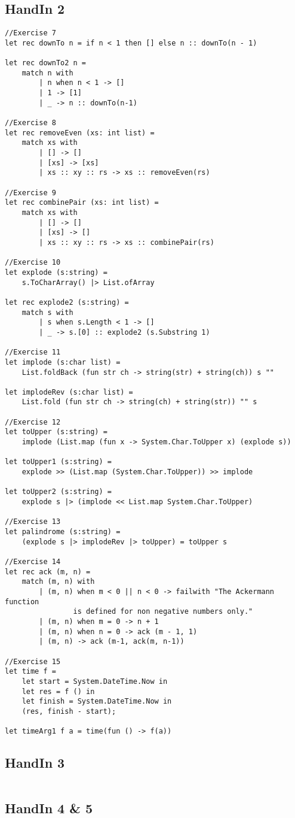 \subsection{HandIn 2}
\label{Appendix_FSharp_Grooss_2}
\begin{lstlisting}
//Exercise 7
let rec downTo n = if n < 1 then [] else n :: downTo(n - 1)

let rec downTo2 n = 
    match n with
		| n when n < 1 -> []
        | 1 -> [1]
        | _ -> n :: downTo(n-1)

//Exercise 8
let rec removeEven (xs: int list) =
    match xs with
        | [] -> []
        | [xs] -> [xs]
        | xs :: xy :: rs -> xs :: removeEven(rs)

//Exercise 9
let rec combinePair (xs: int list) =
    match xs with
        | [] -> []
        | [xs] -> []
        | xs :: xy :: rs -> xs :: combinePair(rs)

//Exercise 10
let explode (s:string) =
    s.ToCharArray() |> List.ofArray

let rec explode2 (s:string) =
    match s with
        | s when s.Length < 1 -> []
        | _ -> s.[0] :: explode2 (s.Substring 1)

//Exercise 11
let implode (s:char list) =
    List.foldBack (fun str ch -> string(str) + string(ch)) s ""
    
let implodeRev (s:char list) =
    List.fold (fun str ch -> string(ch) + string(str)) "" s

//Exercise 12
let toUpper (s:string) =
    implode (List.map (fun x -> System.Char.ToUpper x) (explode s))

let toUpper1 (s:string) =
    explode >> (List.map (System.Char.ToUpper)) >> implode

let toUpper2 (s:string) =
    explode s |> (implode << List.map System.Char.ToUpper)

//Exercise 13
let palindrome (s:string) =
    (explode s |> implodeRev |> toUpper) = toUpper s

//Exercise 14
let rec ack (m, n) =
    match (m, n) with
        | (m, n) when m < 0 || n < 0 -> failwith "The Ackermann function 
				is defined for non negative numbers only."
        | (m, n) when m = 0 -> n + 1
        | (m, n) when n = 0 -> ack (m - 1, 1)
        | (m, n) -> ack (m-1, ack(m, n-1))

//Exercise 15
let time f =
    let start = System.DateTime.Now in
    let res = f () in
    let finish = System.DateTime.Now in
    (res, finish - start);

let timeArg1 f a = time(fun () -> f(a))
\end{lstlisting}
\subsection{HandIn 3}
\label{Appendix_FSharp_Grooss_3}
\begin{lstlisting}
\end{lstlisting}
\subsection{HandIn 4 \& 5}
\label{Appendix_FSharp_Grooss_4and5}
\begin{lstlisting}
\end{lstlisting}
